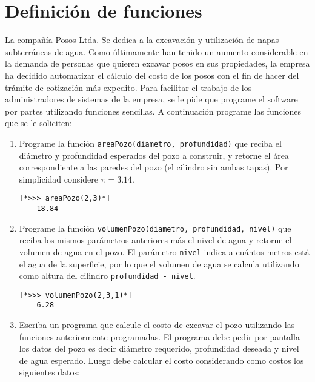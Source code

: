 \section{Definición de funciones}

  La compañía Posos Ltda.
  Se dedica a la excavación y utilización de napas subterráneas de agua.
  Como últimamente han tenido un aumento considerable
  en la demanda de personas que quieren excavar posos en sus propiedades,
  la empresa ha decidido automatizar el cálculo del costo
  de los posos con el fin de hacer del trámite de cotización
  más expedito.
  Para facilitar el trabajo de los administradores de sistemas
  de la empresa,
  se le pide que programe el software por partes
  utilizando funciones sencillas.
  A continuación programe las funciones que se le soliciten:
  
  \begin{enumerate}
  \item
    Programe la función \texttt{areaPozo(diametro, profundidad)}
    que reciba el diámetro y profundidad esperados del pozo a construir,
    y retorne el área correspondiente a las paredes del pozo
    (el cilindro sin ambas tapas).
    Por simplicidad considere \( \pi = 3.14\).
    
    \begin{lstlisting}[style=consola]
    [*>>> areaPozo(2,3)*]
    18.84
    \end{lstlisting}
  \item
    Programe la función \texttt{volumenPozo(diametro, profundidad, nivel)}
    que reciba los mismos parámetros anteriores más el nivel de agua y retorne
    el volumen de agua en el pozo.
    El parámetro \texttt{nivel} indica a cuántos metros está el agua de la superficie,
    por lo que el volumen de agua se calcula utilizando como altura del cilindro
    \texttt{profundidad - nivel}.
    
    \begin{lstlisting}[style=consola]
    [*>>> volumenPozo(2,3,1)*]
    6.28
    \end{lstlisting}
  \item
    Escriba un programa que calcule el costo de excavar el pozo utilizando las funciones
    anteriormente programadas.
    El programa debe pedir por pantalla los datos del pozo
    es decir diámetro requerido, profundidad deseada y nivel de agua esperado.
    Luego debe calcular el costo considerando como costos los siguientes datos:
    
    \vspace*{\baselineskip}
    

\end{enumerate}
